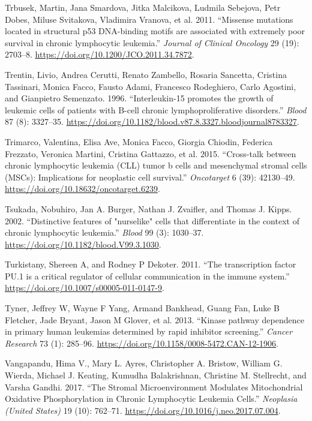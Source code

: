 \documentclass[11pt, a4paper, twosided]{book}
\newenvironment{CSLReferences}%
  {}%
  {\par}
\begin{document}
\begin{CSLReferences}{1}{0}
\leavevmode{}%
Trbusek, Martin, Jana Smardova, Jitka Malcikova, Ludmila Sebejova, Petr Dobes, Miluse Svitakova, Vladimira Vranova, et al. 2011. {``{Missense mutations located in structural p53 DNA-binding motifs are associated with extremely poor survival in chronic lymphocytic leukemia}.''} \emph{Journal of Clinical Oncology} 29 (19): 2703--8. \url{https://doi.org/10.1200/JCO.2011.34.7872}.

\leavevmode{}%
Trentin, Livio, Andrea Cerutti, Renato Zambello, Rosaria Sancetta, Cristina Tassinari, Monica Facco, Fausto Adami, Francesco Rodeghiero, Carlo Agostini, and Gianpietro Semenzato. 1996. {``{Interleukin-15 promotes the growth of leukemic cells of patients with B-cell chronic lymphoproliferative disorders}.''} \emph{Blood} 87 (8): 3327--35. \url{https://doi.org/10.1182/blood.v87.8.3327.bloodjournal8783327}.

\leavevmode{}%
Trimarco, Valentina, Elisa Ave, Monica Facco, Giorgia Chiodin, Federica Frezzato, Veronica Martini, Cristina Gattazzo, et al. 2015. {``{Cross-talk between chronic lymphocytic leukemia (CLL) tumor b cells and mesenchymal stromal cells (MSCs): Implications for neoplastic cell survival}.''} \emph{Oncotarget} 6 (39): 42130--49. \url{https://doi.org/10.18632/oncotarget.6239}.

\leavevmode{}%
Tsukada, Nobuhiro, Jan A. Burger, Nathan J. Zvaifler, and Thomas J. Kipps. 2002. {``{Distinctive features of "nurselike" cells that differentiate in the context of chronic lymphocytic leukemia}.''} \emph{Blood} 99 (3): 1030--37. \url{https://doi.org/10.1182/blood.V99.3.1030}.

\leavevmode{}%
Turkistany, Shereen A, and Rodney P Dekoter. 2011. {``{The transcription factor PU.1 is a critical regulator of cellular communication in the immune system}.''} \url{https://doi.org/10.1007/s00005-011-0147-9}.

\leavevmode{}%
Tyner, Jeffrey W, Wayne F Yang, Armand Bankhead, Guang Fan, Luke B Fletcher, Jade Bryant, Jason M Glover, et al. 2013. {``{Kinase pathway dependence in primary human leukemias determined by rapid inhibitor screening}.''} \emph{Cancer Research} 73 (1): 285--96. \url{https://doi.org/10.1158/0008-5472.CAN-12-1906}.

\leavevmode{}%
Vangapandu, Hima V., Mary L. Ayres, Christopher A. Bristow, William G. Wierda, Michael J. Keating, Kumudha Balakrishnan, Christine M. Stellrecht, and Varsha Gandhi. 2017. {``{The Stromal Microenvironment Modulates Mitochondrial Oxidative Phosphorylation in Chronic Lymphocytic Leukemia Cells}.''} \emph{Neoplasia (United States)} 19 (10): 762--71. \url{https://doi.org/10.1016/j.neo.2017.07.004}.


\end{CSLReferences}
\end{document}
